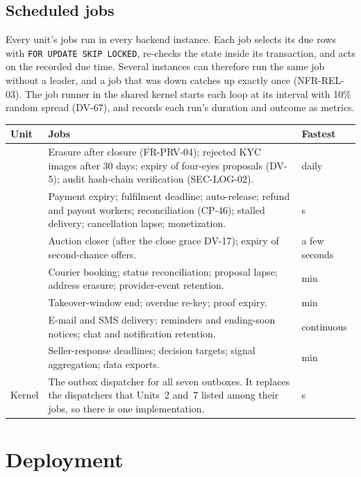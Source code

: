 \documentclass[11pt,a4paper]{article}
\newenvironment{dtable}[1]{\small\begin{longtable}{#1}}{\end{longtable}}
\begin{document}
\subsection{Scheduled jobs}
\label{sec:jobs}
Every unit's jobs run in every backend instance. Each job selects its due rows with \texttt{FOR UPDATE SKIP LOCKED}, re-checks the state inside its transaction, and acts on the recorded due time. Several instances can therefore run the same job without a leader, and a job that was down catches up exactly once (NFR-REL-03). The job runner in the shared kernel starts each loop at its interval with 10\% random spread (DV-67), and records each run's duration and outcome as metrics.
\begin{dtable}{@{}>{\raggedright\arraybackslash}p{1.1cm}>{\raggedright\arraybackslash}p{11.6cm}>{\raggedright\arraybackslash}p{2.3cm}@{}}
\toprule
\textbf{Unit} & \textbf{Jobs} & \textbf{Fastest} \\ \midrule \endhead
1 & Erasure after closure (FR-PRV-04); rejected KYC images after 30 days; expiry of four-eyes proposals (DV-5); audit hash-chain verification (SEC-LOG-02). & daily \\
2 & Payment expiry; fulfilment deadline; auto-release; refund and payout workers; reconciliation (CP-46); stalled delivery; cancellation lapse; monetization. & 30 s \\
3 & Auction closer (after the close grace DV-17); expiry of second-chance offers. & a few seconds \\
4 & Courier booking; status reconciliation; proposal lapse; address erasure; provider-event retention. & 1 min \\
5 & Takeover-window end; overdue re-key; proof expiry. & 1 min \\
6 & E-mail and SMS delivery; reminders and ending-soon notices; chat and notification retention. & continuous \\
7 & Seller-response deadlines; decision targets; signal aggregation; data exports. & 5 min \\
Kernel & The outbox dispatcher for all seven outboxes. It replaces the dispatchers that Units~2 and~7 listed among their jobs, so there is one implementation. & 5 s \\
\bottomrule
\end{dtable}
\section{Deployment}
\label{sec:deploy}
\end{document}
